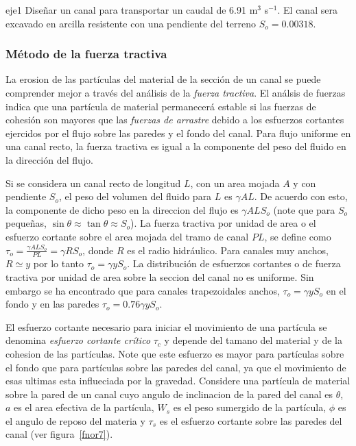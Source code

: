 \documentclass[11pt, oneside]{article}
\begin{document}
\begin{eje}{}{eje1}
Diseñar un canal para transportar un caudal de 6.91 m$^3$ s$^{-1}$. El canal sera excavado en arcilla resistente con una pendiente del terreno $S_o = 0.00318$.
\end{eje}

\subsubsection{M\'etodo de la fuerza tractiva}
La erosion de las part\'iculas del material de la secci\'on de un canal se puede comprender mejor a trav\'es del an\'alisis de la \emph{fuerza tractiva}. El an\'alsis de fuerzas indica que una part\'icula de material permanecer\'a estable si las fuerzas de cohesi\'on son mayores que las \emph{fuerzas de arrastre} debido a los esfuerzos cortantes ejercidos por el flujo sobre las paredes y el fondo del canal. Para flujo uniforme en una canal recto, la fuerza tractiva es igual a la componente del peso del fluido en la direcci\'on del flujo. 

Si se considera un canal recto de longitud $L$, con un area mojada $A$ y con pendiente $S_o$, el peso del volumen del fluido para $L$ es $\gamma A L$. De acuerdo con esto, la componente de dicho peso en la direccion del flujo es $\gamma A L S_o$ (note que para $S_o$ pequeñas, $\sin \theta \approx \tan \theta \approx S_o$). La fuerza tractiva por unidad de area o el esfuerzo cortante sobre el area mojada del tramo de canal $PL$, se define como $\tau_o = \frac{\gamma A L S_o}{PL} = \gamma R S_o$, donde $R$ es el radio hidr\'aulico. Para canales muy anchos, $R \simeq y$ por lo tanto $\tau_o = \gamma y S_o$. La distribuci\'on de esfuerzos cortantes o de fuerza tractiva por unidad de area sobre la seccion del canal no es uniforme. Sin embargo se ha encontrado que para canales trapezoidales anchos, $\tau_o = \gamma y S_o$ en el fondo y en las paredes $\tau_o = 0.76 \gamma y S_o$. 

El esfuerzo cortante necesario para iniciar el movimiento de una part\'icula se denomina \emph{esfuerzo cortante cr\'itico} $\tau_c$ y depende del tamano del material y de la cohesion de las part\'iculas. Note que este esfuerzo es mayor para part\'iculas sobre el fondo que para part\'iculas sobre las paredes del canal, ya que el movimiento de esas ultimas esta influeciada por la gravedad. Considere una part\'icula de material sobre la pared de un canal cuyo angulo de inclinacion de la pared del canal es $\theta$, $a$ es el area efectiva de la part\'icula, $W_s$ es el peso sumergido de la part\'icula, $\phi$ es el angulo de reposo del materia  y $\tau_s$ es el esfuerzo cortante sobre las paredes del canal  (ver figura~\ref{fnor7}). 
\end{document}
